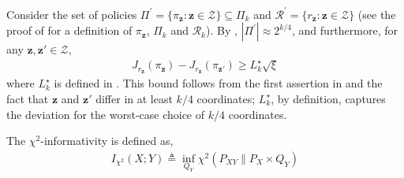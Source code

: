 Consider the set of policies $\Pi^\prime = \{ \pi_{\bm{z}} : \bm{z} \in \mathcal{Z} \} \subseteq \Pi_k$  and $\mathcal{R}^\prime = \{ r_{\bm{z}} : \bm{z} \in \mathcal{Z} \}$ (see the proof of  for a definition of $\pi_{\bm{z}}$, $\Pi_k$ and $\mathcal{R}_k$). By , $|\Pi^\prime| \approx 2^{k/4}$, and furthermore, for any $\bm{z}, \bm{z}' \in \mathcal{Z}$,
\begin{align} \label{eq:91222}
    J_{r_{\bm{z}}} (\pi_{\bm{z}}) - J_{r_{\bm{z}}} (\pi_{\bm{z}'}) \ge L_k^\star \sqrt{\xi} 
\end{align}
where $L_k^\star$ is defined in . This bound follows from the first assertion in  and the fact that $\bm{z}$ and $\bm{z}'$ differ in at least $k/4$ coordinates; $L_k^\star$, by definition, captures the deviation for the worst-case choice of $k/4$ coordinates.

\begin{definition}
The $\chi^2$-informativity is defined as,
\begin{align*}
I_{\chi^2}(X ; Y) \triangleq \inf _{Q_Y} \chi^2\left(P_{X Y} \| P_X \times Q_Y\right)    
\end{align*}
\end{definition}

